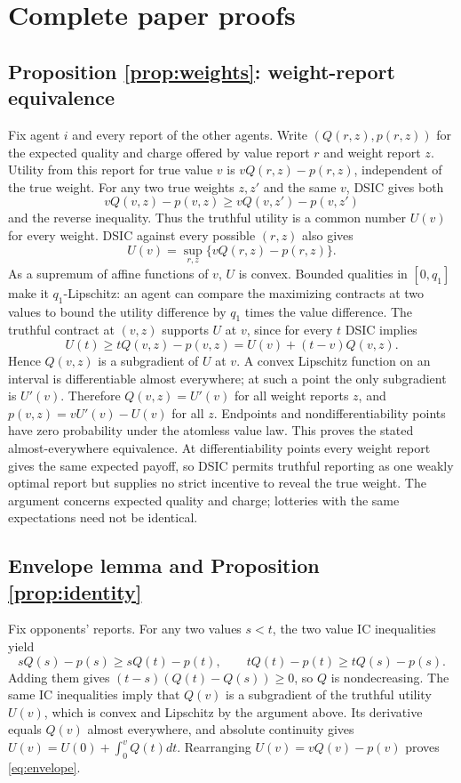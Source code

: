 \documentclass[11pt]{article}
\begin{document}
\appendix
\section{Complete paper proofs}\label{app:proofs}

\subsection{Proposition \ref{prop:weights}: weight-report equivalence}

Fix agent $i$ and every report of the other agents. Write $(Q(r,z),p(r,z))$ for the expected quality and charge offered by value report $r$ and weight report $z$. Utility from this report for true value $v$ is $vQ(r,z)-p(r,z)$, independent of the true weight. For any two true weights $z,z'$ and the same $v$, DSIC gives both
\[
vQ(v,z)-p(v,z)\ge vQ(v,z')-p(v,z')
\]
and the reverse inequality. Thus the truthful utility is a common number $U(v)$ for every weight. DSIC against every possible $(r,z)$ also gives
\[
U(v)=\sup_{r,z}\{vQ(r,z)-p(r,z)\}.
\]
As a supremum of affine functions of $v$, $U$ is convex. Bounded qualities in $[0,q_1]$ make it $q_1$-Lipschitz: an agent can compare the maximizing contracts at two values to bound the utility difference by $q_1$ times the value difference. The truthful contract at $(v,z)$ supports $U$ at $v$, since for every $t$ DSIC implies
\[
U(t)\ge tQ(v,z)-p(v,z)=U(v)+(t-v)Q(v,z).
\]
Hence $Q(v,z)$ is a subgradient of $U$ at $v$. A convex Lipschitz function on an interval is differentiable almost everywhere; at such a point the only subgradient is $U'(v)$. Therefore $Q(v,z)=U'(v)$ for all weight reports $z$, and $p(v,z)=vU'(v)-U(v)$ for all $z$. Endpoints and nondifferentiability points have zero probability under the atomless value law. This proves the stated almost-everywhere equivalence. At differentiability points every weight report gives the same expected payoff, so DSIC permits truthful reporting as one weakly optimal report but supplies no strict incentive to reveal the true weight. The argument concerns expected quality and charge; lotteries with the same expectations need not be identical.

\subsection{Envelope lemma and Proposition \ref{prop:identity}}

Fix opponents' reports. For any two values $s<t$, the two value IC inequalities yield
\[
sQ(s)-p(s)\ge sQ(t)-p(t),\qquad
tQ(t)-p(t)\ge tQ(s)-p(s).
\]
Adding them gives $(t-s)(Q(t)-Q(s))\ge0$, so $Q$ is nondecreasing. The same IC inequalities imply that $Q(v)$ is a subgradient of the truthful utility $U(v)$, which is convex and Lipschitz by the argument above. Its derivative equals $Q(v)$ almost everywhere, and absolute continuity gives $U(v)=U(0)+\int_0^vQ(t)dt$. Rearranging $U(v)=vQ(v)-p(v)$ proves \eqref{eq:envelope}.
\end{document}
